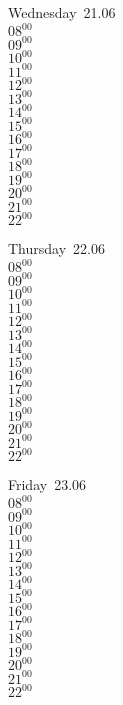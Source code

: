 \documentclass[11pt,a4paper]{book}\usepackage[]{graphicx}\usepackage[]{color}
\begin{document}
\begin{weekdaybox}
  Wednesday~21.06\\
  { 
  \vfill
  $08^{00}$\\
$09^{00}$\\
$10^{00}$\\
$11^{00}$\\
$12^{00}$\\
$13^{00}$\\
$14^{00}$\\
$15^{00}$\\
$16^{00}$\\
$17^{00}$\\
$18^{00}$\\
$19^{00}$\\
$20^{00}$\\
$21^{00}$\\
$22^{00}$\\
  }
\end{weekdaybox}
\clearpage
\begin{headerbox}
\end{headerbox}
\begin{weekdaybox}
  Thursday~22.06\\
  { 
  \vfill
  $08^{00}$\\
$09^{00}$\\
$10^{00}$\\
$11^{00}$\\
$12^{00}$\\
$13^{00}$\\
$14^{00}$\\
$15^{00}$\\
$16^{00}$\\
$17^{00}$\\
$18^{00}$\\
$19^{00}$\\
$20^{00}$\\
$21^{00}$\\
$22^{00}$\\
  }
\end{weekdaybox} 
\begin{weekdaybox}
  Friday~23.06\\
  { 
  \vfill
  $08^{00}$\\
$09^{00}$\\
$10^{00}$\\
$11^{00}$\\
$12^{00}$\\
$13^{00}$\\
$14^{00}$\\
$15^{00}$\\
$16^{00}$\\
$17^{00}$\\
$18^{00}$\\
$19^{00}$\\
$20^{00}$\\
$21^{00}$\\
$22^{00}$\\
  }
\end{weekdaybox}
\end{document}
